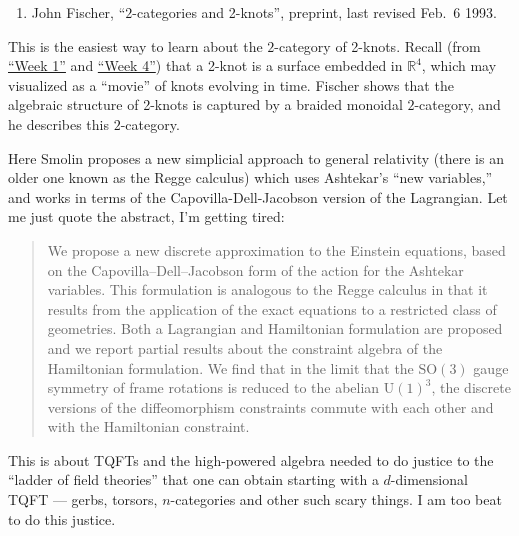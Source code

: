 \documentclass{article}
\def\tightlist{}
\renewcommand{\texttt}[1]{%
  \begingroup
  \ttfamily
  \begingroup\lccode`~=`/\lowercase{\endgroup\def~}{/\discretionary{}{}{}}%
  \begingroup\lccode`~=`[\lowercase{\endgroup\def~}{[\discretionary{}{}{}}%
  \begingroup\lccode`~=`.\lowercase{\endgroup\def~}{.\discretionary{}{}{}}%
  \catcode`/=\active\catcode`[=\active\catcode`.=\active
  \scantokens{#1\noexpand}%
  \endgroup
}
\begin{document}
\begin{enumerate}
\def\labelenumi{\arabic{enumi})}
\setcounter{enumi}{1}
\tightlist
\item
  John Fischer, ``\(2\)-categories and 2-knots'', preprint, last
  revised Feb.~6 1993. 
\end{enumerate}
\noindent
This is the easiest way to learn about the \(2\)-category of 2-knots.
Recall (from \protect\hyperlink{week1}{``Week 1''} and
\protect\hyperlink{week4}{``Week 4''}) that a 2-knot is a surface
embedded in \(\mathbb{R}^4\), which may visualized as a ``movie'' of
knots evolving in time. Fischer shows that the algebraic structure of
2-knots is captured by a braided monoidal \(2\)-category, and he
describes this \(2\)-category.

\noindent
Here Smolin proposes a new simplicial approach to general relativity
(there is an older one known as the Regge calculus) which uses
Ashtekar's ``new variables,'' and works in terms of the
Capovilla-Dell-Jacobson version of the Lagrangian. Let me just quote the
abstract, I'm getting tired:

\begin{quote}

We propose a new discrete approximation to the Einstein equations, based
on the Capovilla--Dell--Jacobson form of the action for the Ashtekar
variables. This formulation is analogous to the Regge calculus in that
it results from the application of the exact equations to a restricted
class of geometries. Both a Lagrangian and Hamiltonian formulation are
proposed and we report partial results about the constraint algebra of
the Hamiltonian formulation. We find that in the limit that the
\(\mathrm{SO}(3)\) gauge symmetry of frame rotations is reduced to the
abelian \(\mathrm{U}(1)^3\), the discrete versions of the diffeomorphism
constraints commute with each other and with the Hamiltonian constraint.

\end{quote}

\noindent
This is about TQFTs and the high-powered algebra needed to do justice to
the ``ladder of field theories'' that one can obtain starting with a
\(d\)-dimensional TQFT --- gerbs, torsors, \(n\)-categories and other such
scary things. I am too beat to do this justice.
\end{document}
